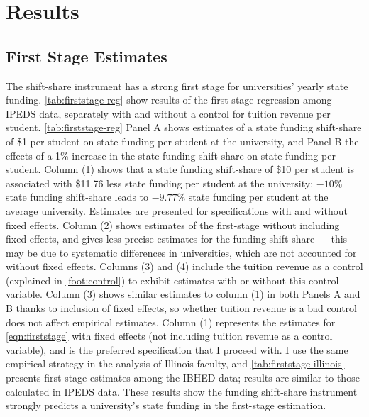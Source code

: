 \section{Results}
\label{sec:results}

\subsection{First Stage Estimates}
The shift-share instrument has a strong first stage for universities' yearly state funding.
\autoref{tab:firststage-reg} show results of the first-stage regression among IPEDS data, separately with and without a control for tuition revenue per student.
\autoref{tab:firststage-reg} Panel A shows estimates of a state funding shift-share of \$1 per student on state funding per student at the university, and Panel B the effects of a 1\% increase in the state funding shift-share on state funding per student.
Column (1) shows that a state funding shift-share of \$10 per student is associated with \$11.76 less state funding per student at the university; $-10$\% state funding shift-share leads to $-9.77$\% state funding per student at the average university.
Estimates are presented for specifications with and without fixed effects.
Column (2) shows estimates of the first-stage without including fixed effects, and gives less precise estimates for the funding shift-share --- this may be due to systematic differences in universities, which are not accounted for without fixed effects.
Columns (3) and (4) include the tuition revenue as a control (explained in \autoref{foot:control}) to exhibit estimates with or without this control variable.
Column (3) shows similar estimates to column (1) in both Panels A and B thanks to inclusion of fixed effects, so whether tuition revenue is a bad control does not affect empirical estimates.
Column (1) represents the estimates for \autoref{eqn:firststage} with fixed effects (not including tuition revenue as a control variable), and is the preferred specification that I proceed with.
I use the same empirical strategy in the analysis of Illinois faculty, and \autoref{tab:firststage-illinois} presents first-stage estimates among the IBHED data; results are similar to those calculated in IPEDS data.
These results show the funding shift-share instrument strongly predicts a university's state funding in the first-stage estimation.

